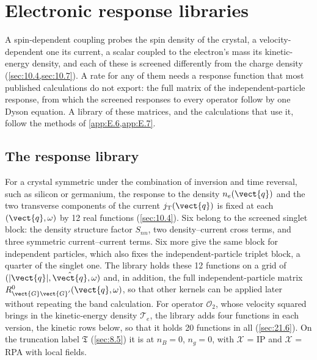 \section{Electronic response libraries}\label{app:E.16}

A spin-dependent coupling probes the spin density of the crystal, a velocity-dependent one its current, a scalar coupled to the electron's mass its kinetic-energy density, and each of these is screened differently from the charge density (\cref{sec:10.4,sec:10.7}). A rate for any of them needs a response function that most published calculations do not export: the full matrix of the independent-particle response, from which the screened responses to every operator follow by one Dyson equation. A library of these matrices, and the calculations that use it, follow the methods of \cref{app:E.6,app:E.7}.

\subsection{The response library}

For a crystal symmetric under the combination of inversion and time reversal, such as silicon or germanium, the response to the density $n_e(\vect{q})$ and the two transverse components of the current $j_{\mathrm{T}}(\vect{q})$ is fixed at each $(\vect{q},\omega)$ by 12 real functions (\cref{sec:10.4}). Six belong to the screened singlet block: the density structure factor $S_{nn}$, two density--current cross terms, and three symmetric current--current terms. Six more give the same block for independent particles, which also fixes the independent-particle triplet block, a quarter of the singlet one. The library holds these 12 functions on a grid of $(|\vect{q}|,\hat{\vect{q}},\omega)$ and, in addition, the full independent-particle matrix $R^0_{\vect{G}\vect{G}'}(\vect{q},\omega)$, so that other kernels can be applied later without repeating the band calculation. For operator $\mathcal{O}_2$, whose velocity squared brings in the kinetic-energy density $\mathcal{T}_e$, the library adds four functions in each version, the kinetic rows below, so that it holds 20 functions in all (\cref{sec:21.6}). On the truncation label $\mathfrak{T}$ (\cref{sec:8.5}) it is at $n_B = 0$, $n_g = 0$, with $\mathcal{X}$ = IP and $\mathcal{X}$ = RPA with local fields.

